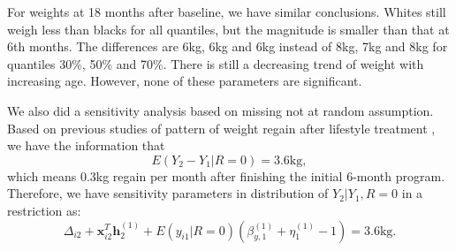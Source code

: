 \documentclass[12pt]{article}
\begin{document}
For weights at 18 months after baseline, we have similar
conclusions. Whites still weigh less than blacks for all quantiles,
but the magnitude is smaller than that at 6th months.  The differences
are 6kg, 6kg and 6kg instead of 8kg, 7kg and 8kg for quantiles 30\%,
50\% and 70\%. There is still a decreasing trend of weight with
increasing age.  However, none of these parameters are significant.

We also did a sensitivity analysis based on missing not at random
assumption. Based on previous studies of pattern of weight regain
after lifestyle treatment \citep{wadden2001, perri2008extended}, we
have the information that
\begin{displaymath}
  E(Y_2 - Y_1| R=0) = 3.6 \text{kg},
\end{displaymath}
which means 0.3kg regain per month after finishing the initial 6-month
program.  Therefore, we have sensitivity parameters in distribution of
$Y_2|Y_1, R=0$ in a restriction as:
\begin{displaymath}
  \Delta_{i2} + \bm x_{i2}^T \bm h_2^{(1)} + E(y_{i1}|R=0)(\beta_{y,1}^{(1)} +\eta_1^{(1)} - 1) = 3.6 \text{kg}.
\end{displaymath}
\end{document}
